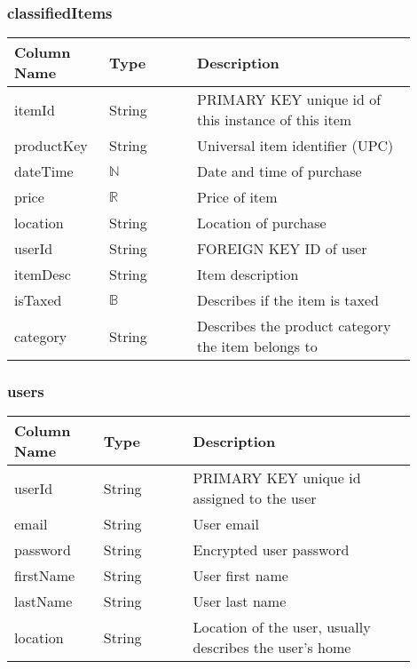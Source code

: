 \documentclass[12pt, titlepage]{article}
\begin{document}
\subsubsection{classifiedItems}
\begin{table}[H]
  \begin{tabular}{|p{0.2\linewidth}|p{0.2\linewidth}|p{0.5\linewidth}|}
    \hline
    \textbf{Column Name} & \textbf{Type} & \textbf{Description} \\
    \hline
    itemId & String & PRIMARY KEY unique id of this instance of this item \\
    \hline
    productKey & String & Universal item identifier (UPC) \\
    \hline
    dateTime & $\mathbb{N}$ & Date and time of purchase \\
    \hline
    price & $\mathbb{R}$ & Price of item \\
    \hline
    location & String & Location of purchase \\
    \hline
    userId & String & FOREIGN KEY ID of user\\
    \hline
    itemDesc & String & Item description\\
    \hline
    isTaxed & $\mathbb{B}$ & Describes if the item is taxed\\
    \hline
    category & String & Describes the product category the item belongs to\\
    \hline
  \end{tabular}
\end{table}

\subsubsection{users}
\begin{table}[H]
  \begin{tabular}{|p{0.2\linewidth}|p{0.2\linewidth}|p{0.5\linewidth}|}
    \hline
    \textbf{Column Name} & \textbf{Type} & \textbf{Description} \\
    \hline
    userId & String & PRIMARY KEY unique id assigned to the user \\
    \hline
    email & String & User email \\
    \hline
    password & String & Encrypted user password \\
    \hline
    firstName & String & User first name \\
    \hline
    lastName & String & User last name \\
    \hline
    location & String & Location of the user, usually describes the user's home\\
    \hline
  \end{tabular}
\end{table}
\end{document}

